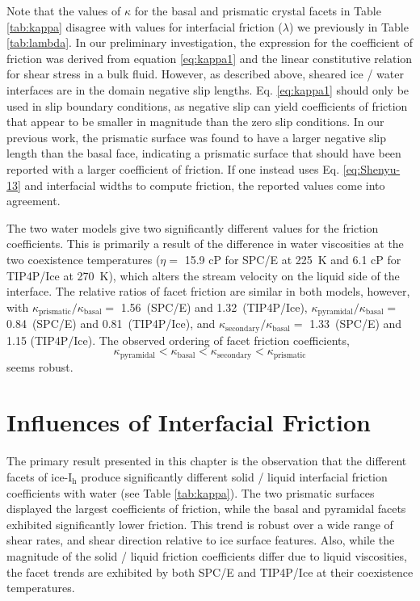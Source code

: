 Note that the values of $\kappa$ for the basal and prismatic crystal
facets in Table \ref{tab:kappa} disagree with values for interfacial
friction ($\lambda$) we previously in Table \ref{tab:lambda}. In our
preliminary investigation, the expression for the coefficient of
friction was derived from equation \eqref{eq:kappa1} and the linear
constitutive relation for shear stress in a bulk fluid.  However, as
described above, sheared ice / water interfaces are in the domain
negative slip lengths. Eq. \eqref{eq:kappa1} should only be used in
slip boundary conditions, as negative slip can yield coefficients of
friction that appear to be smaller in magnitude than the zero slip
conditions. In our previous work, the prismatic surface was found to
have a larger negative slip length than the basal face, indicating a
prismatic surface that should have been reported with a larger
coefficient of friction. If one instead uses Eq. \eqref{eq:Shenyu-13}
and interfacial widths to compute friction, the reported values come
into agreement.

The two water models give two significantly different values for the
friction coefficients. This is primarily a result of the difference in
water viscosities at the two coexistence temperatures ($\eta = $ 15.9
cP for SPC/E at 225~K and 6.1 cP for TIP4P/Ice at 270~K), which alters
the stream velocity on the liquid side of the interface. The relative
ratios of facet friction are similar in both models, however, with
$\kappa_\mathrm{prismatic} / \kappa_\mathrm{basal} =$ 1.56~(SPC/E) and
1.32~(TIP4P/Ice),
$\kappa_\mathrm{pyramidal} / \kappa_\mathrm{basal} =$ 0.84~(SPC/E) and
0.81~(TIP4P/Ice), and
$\kappa_\mathrm{secondary} / \kappa_\mathrm{basal} =$ 1.33~(SPC/E) and
1.15 (TIP4P/Ice). The observed ordering of facet friction
coefficients,
\begin{equation}
\kappa_\mathrm{pyramidal} < \kappa_\mathrm{basal} <
\kappa_\mathrm{secondary} < \kappa_\mathrm{prismatic} 
\end{equation} 
seems robust.

 
\section{Influences of Interfacial Friction}
The primary result presented in this chapter is the observation that
the different facets of ice-I$_\mathrm{h}$ produce significantly
different solid / liquid interfacial friction coefficients with water
(see Table \ref{tab:kappa}).  The two prismatic surfaces displayed the
largest coefficients of friction, while the basal and pyramidal facets
exhibited significantly lower friction. This trend is robust over a
wide range of shear rates, and shear direction relative to ice surface
features. Also, while the magnitude of the solid / liquid friction
coefficients differ due to liquid viscosities, the facet trends are
exhibited by both SPC/E and TIP4P/Ice at their coexistence
temperatures.

